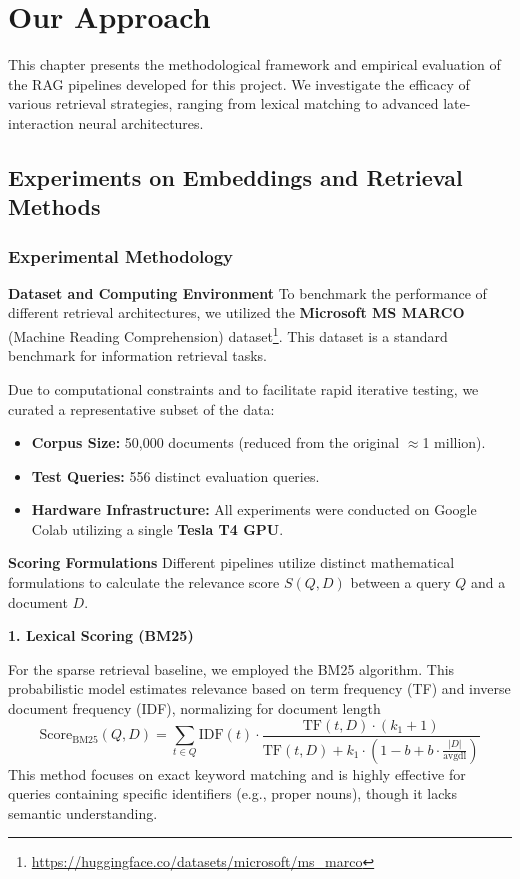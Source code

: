 \chapter{Our Approach}

This chapter presents the methodological framework and empirical evaluation of the RAG pipelines developed for this project. We investigate the efficacy of various retrieval strategies, ranging from lexical matching to advanced late-interaction neural architectures.

\section{Experiments on Embeddings and Retrieval Methods}

\subsection{Experimental Methodology}

\textbf{Dataset and Computing Environment}
To benchmark the performance of different retrieval architectures, we utilized the \textbf{Microsoft MS MARCO} (Machine Reading Comprehension) dataset\footnote{\url{https://huggingface.co/datasets/microsoft/ms_marco}}. This dataset is a standard benchmark for information retrieval tasks.

Due to computational constraints and to facilitate rapid iterative testing, we curated a representative subset of the data:
\begin{itemize}
    \item \textbf{Corpus Size:} 50,000 documents (reduced from the original $\approx$1 million).
    \item \textbf{Test Queries:} 556 distinct evaluation queries.
    \item \textbf{Hardware Infrastructure:} All experiments were conducted on Google Colab utilizing a single \textbf{Tesla T4 GPU}.
\end{itemize}

\textbf{Scoring Formulations}
Different pipelines utilize distinct mathematical formulations to calculate the relevance score $S(Q, D)$ between a query $Q$ and a document $D$.

\textbf{1. Lexical Scoring (BM25)}

For the sparse retrieval baseline, we employed the BM25 algorithm. This probabilistic model estimates relevance based on term frequency (TF) and inverse document frequency (IDF), normalizing for document length
\begin{equation*}
    \text{Score}_{\text{BM25}}(Q, D) = \sum_{t \in Q} \text{IDF}(t) \cdot \frac{\text{TF}(t, D) \cdot (k_1 + 1)}{\text{TF}(t, D) + k_1 \cdot \left(1 - b + b \cdot \frac{|D|}{\text{avgdl}}\right)}
\end{equation*}
This method focuses on exact keyword matching and is highly effective for queries containing specific identifiers (e.g., proper nouns), though it lacks semantic understanding.

